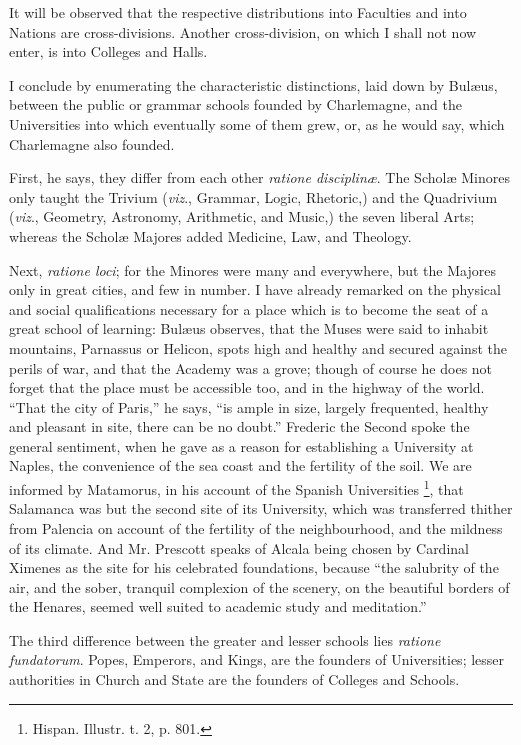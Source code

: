 It will be observed that the
respective distributions into Faculties and into Nations are
cross-divisions. Another cross-division, on which I shall not now
enter, is into Colleges and Halls.

I conclude by enumerating the
characteristic distinctions, laid down by Bulæus, between the public
or grammar schools founded by Charlemagne, and the Universities
into which eventually some of them grew, or, as he would say, which
Charlemagne also founded.

First, he says, they differ
from each other \emph{ratione disciplinæ}. The Scholæ Minores only
taught the Trivium (\emph{viz}., Grammar, Logic, Rhetoric,) and the
Quadrivium (\emph{viz}., Geometry, Astronomy, Arithmetic, and Music,)
the seven liberal Arts; whereas the Scholæ Majores added Medicine,
Law, and Theology.

Next, \emph{ratione loci}; for
the Minores were many and everywhere, but the Majores only in great
cities, and few in number. I have already remarked on the physical and
social qualifications necessary for a place which is to become the
seat of a great school of learning: Bulæus observes, that the Muses
were said to inhabit mountains, Parnassus or Helicon, spots high and
healthy and secured against the perils of war, and that the Academy
was a grove; though of course he does not forget that the place must
be accessible too, and in the highway of the world. ``That the city
of Paris,'' he says, ``is ample in size, largely frequented, healthy
and pleasant in site, there can be no doubt.'' Frederic the Second
spoke the general sentiment, when he gave as a reason for establishing
a University at Naples, the convenience of the sea coast and the
fertility of the soil. We are informed by Matamorus, in his account of
the Spanish Universities \footnote{Hispan. Illustr. t. 2, p. 801.},
that Salamanca was but the second site of its University, which was
transferred thither from Palencia on account of the fertility of the
neighbourhood, and the mildness of its climate. And Mr. Prescott
speaks of Alcala being chosen by Cardinal Ximenes as the site for his
celebrated foundations, because ``the salubrity of the air, and the
sober, tranquil complexion of the scenery, on the beautiful borders of the Henares, seemed well suited to academic study and
meditation.''

The third difference between
the greater and lesser schools lies \emph{ratione fundatorum}. Popes,
Emperors, and Kings, are the founders of Universities; lesser
authorities in Church and State are the founders of Colleges and
Schools.

